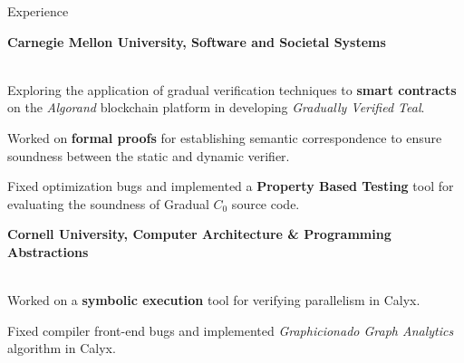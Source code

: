 \begin{rSection}{Experience}
	{\textbf{\large{Carnegie Mellon University, Software and Societal Systems}} \hfill \color{darkgray}{06/2022 - Present} 
	\\ \vspace*{1mm}
	 \hfill \color{darkgray}{Pittsburgh, PA} 
	\\ 
	\color{black}
	\begin{minipage}{40em}
		\color{black}Exploring the application of gradual verification techniques to \textbf{smart contracts} on the \textit{Algorand} blockchain platform in developing \textit{Gradually Verified Teal}.

		\color{black}Worked on \textbf{formal proofs} for establishing semantic correspondence to ensure soundness between the static and dynamic verifier.

		\color{black}Fixed optimization bugs and implemented a \textbf{Property Based Testing} tool for evaluating the soundness of Gradual $C_0$ source code.
	\end{minipage}}

	{\textbf{\large{Cornell University, Computer Architecture \& Programming Abstractions}} \hfill \color{darkgray}{10/2021 - 12/2022} 
	\\ \vspace*{1mm}
	 \hfill \color{darkgray}{Ithaca, NY}
	\\
	\color{black}
	\begin{minipage}{40em}
		\color{black} Worked on a \textbf{symbolic execution} tool for verifying parallelism in Calyx.

		\color{black} Fixed compiler front-end bugs and implemented \textit{Graphicionado Graph Analytics} algorithm in Calyx.
	\end{minipage}} 

\end{rSection} 

